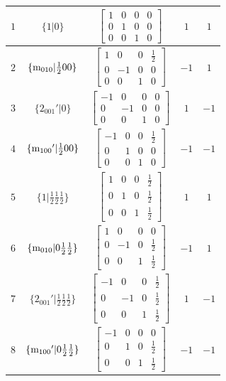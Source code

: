 \documentclass[fleqn,8pt]{jsarticle}
\begin{document}
\begin{longtable}{ccccc}
$ 1 $ & $ \{1|0\} $ & $ \begin{bmatrix} 1 & 0 & 0 & 0 \\ 0 & 1 & 0 & 0 \\ 0 & 0 & 1 & 0 \end{bmatrix} $ & $ 1 $ & $ 1 $ \\ \hline
$ 2 $ & $ \{{\rm m}_{010}|\frac{1}{2} 0 0\} $ & $ \begin{bmatrix} 1 & 0 & 0 & \frac{1}{2} \\ 0 & -1 & 0 & 0 \\ 0 & 0 & 1 & 0 \end{bmatrix} $ & $ -1 $ & $ 1 $ \\ \hline
$ 3 $ & $ \{2{}_{001}{}'|0\} $ & $ \begin{bmatrix} -1 & 0 & 0 & 0 \\ 0 & -1 & 0 & 0 \\ 0 & 0 & 1 & 0 \end{bmatrix} $ & $ 1 $ & $ -1 $ \\ \hline
$ 4 $ & $ \{{\rm m}_{100}{}'|\frac{1}{2} 0 0\} $ & $ \begin{bmatrix} -1 & 0 & 0 & \frac{1}{2} \\ 0 & 1 & 0 & 0 \\ 0 & 0 & 1 & 0 \end{bmatrix} $ & $ -1 $ & $ -1 $ \\ \hline
$ 5 $ & $ \{1|\frac{1}{2} \frac{1}{2} \frac{1}{2}\} $ & $ \begin{bmatrix} 1 & 0 & 0 & \frac{1}{2} \\ 0 & 1 & 0 & \frac{1}{2} \\ 0 & 0 & 1 & \frac{1}{2} \end{bmatrix} $ & $ 1 $ & $ 1 $ \\ \hline
$ 6 $ & $ \{{\rm m}_{010}|0 \frac{1}{2} \frac{1}{2}\} $ & $ \begin{bmatrix} 1 & 0 & 0 & 0 \\ 0 & -1 & 0 & \frac{1}{2} \\ 0 & 0 & 1 & \frac{1}{2} \end{bmatrix} $ & $ -1 $ & $ 1 $ \\ \hline
$ 7 $ & $ \{2{}_{001}{}'|\frac{1}{2} \frac{1}{2} \frac{1}{2}\} $ & $ \begin{bmatrix} -1 & 0 & 0 & \frac{1}{2} \\ 0 & -1 & 0 & \frac{1}{2} \\ 0 & 0 & 1 & \frac{1}{2} \end{bmatrix} $ & $ 1 $ & $ -1 $ \\ \hline
$ 8 $ & $ \{{\rm m}_{100}{}'|0 \frac{1}{2} \frac{1}{2}\} $ & $ \begin{bmatrix} -1 & 0 & 0 & 0 \\ 0 & 1 & 0 & \frac{1}{2} \\ 0 & 0 & 1 & \frac{1}{2} \end{bmatrix} $ & $ -1 $ & $ -1 $ \\
\end{longtable}
\end{document}
